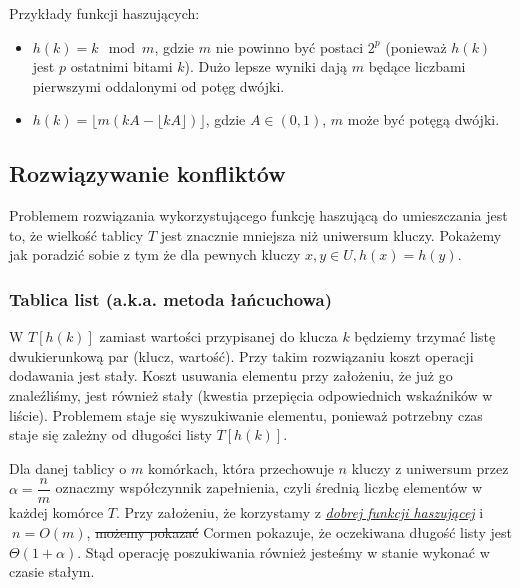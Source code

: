 Przykłady funkcji haszujących:
\begin{itemize}
	\item $h(k) = k \mod m$, gdzie $m$ nie powinno być postaci $2^p$ (ponieważ $h(k)$ jest $p$ ostatnimi bitami $k$).
		Dużo lepsze wyniki dają $m$ będące liczbami pierwszymi oddalonymi od potęg dwójki.
	\item $h(k) = \lfloor m(kA - \lfloor kA \rfloor) \rfloor$, gdzie $A \in (0, 1)$, $m$ może być potęgą dwójki.
\end{itemize}

\subsection{Rozwiązywanie konfliktów}
Problemem rozwiązania wykorzystującego funkcję haszującą do umieszczania jest to, że wielkość tablicy $T$ jest znacznie mniejsza niż uniwersum kluczy.
Pokażemy jak poradzić sobie z tym że dla pewnych kluczy $x, y \in U, h(x) = h(y)$.

\subsubsection{Tablica list (a.k.a. metoda łańcuchowa)}
W $T[h(k)]$ zamiast wartości przypisanej do klucza $k$ będziemy trzymać listę dwukierunkową par (klucz, wartość).
Przy takim rozwiązaniu koszt operacji dodawania jest stały.
Koszt usuwania elementu przy założeniu, że już go znaleźliśmy, jest również stały (kwestia przepięcia odpowiednich wskaźników w liście).
Problemem staje się wyszukiwanie elementu, ponieważ potrzebny czas staje się zależny od długości listy $T[h(k)]$.

Dla danej tablicy o $m$ komórkach, która przechowuje $n$ kluczy z uniwersum przez $\alpha = \dfrac{n}{m}$ oznaczmy współczynnik zapełnienia, czyli średnią liczbę elementów w każdej komórce $T$.
Przy założeniu, że korzystamy z \hyperref[dobra_funkcja_haszujaca]{\textit{dobrej funkcji haszującej}} i$~n = O(m)$, \sout{możemy pokazać} Cormen pokazuje, że oczekiwana długość listy jest $\Theta(1 + \alpha)$.
Stąd operację poszukiwania również jesteśmy w stanie wykonać w czasie stałym.
 